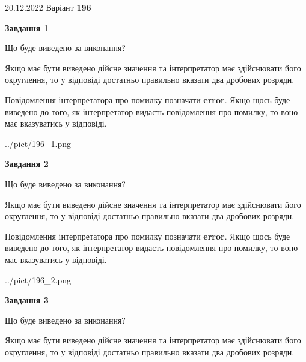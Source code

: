 \documentclass[12pt, ukrainian]{article}
\begin{document}
{20.12.2022 Варіант \No \textbf { 196 }\par}
{
\begin {Large}

{\begin {center}\textbf{Завдання 1}\end {center}}\par
Що буде виведено за виконання? \par

Якщо має бути виведено дійсне значення та інтерпретатор має здійснювати його округлення, 
то у відповіді достатньо правильно вказати два дробових розряди.

Повідомлення інтерпретатора про помилку позначати \textbf{error}.
Якщо щось буде виведено до того, як інтерпретатор видасть повідомлення про помилку, 
то воно має вказуватись у відповіді. \par

\begin{center}
	{../pict/196_1.png}
\end{center}
\newpage

{\begin {center}\textbf{Завдання 2}\end {center}}\par
Що буде виведено за виконання? \par

Якщо має бути виведено дійсне значення та інтерпретатор має здійснювати його округлення, 
то у відповіді достатньо правильно вказати два дробових розряди.

Повідомлення інтерпретатора про помилку позначати \textbf{error}.
Якщо щось буде виведено до того, як інтерпретатор видасть повідомлення про помилку, 
то воно має вказуватись у відповіді. \par

\begin{center}
	{../pict/196_2.png}
\end{center}
\newpage

{\begin {center}\textbf{Завдання 3}\end {center}}\par
Що буде виведено за виконання? \par

Якщо має бути виведено дійсне значення та інтерпретатор має здійснювати його округлення, 
то у відповіді достатньо правильно вказати два дробових розряди.


\end{Large}}
\end{document}
